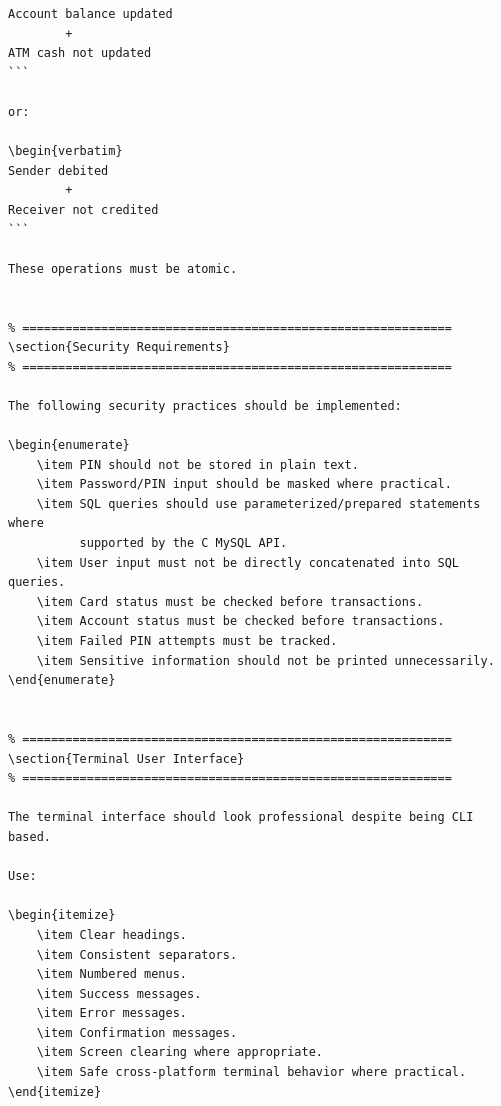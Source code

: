 \documentclass[12pt,a4paper]{article}
\begin{document}
\begin{verbatim}
Account balance updated
        +
ATM cash not updated
```

or:

\begin{verbatim}
Sender debited
        +
Receiver not credited
```

These operations must be atomic.


% ============================================================
\section{Security Requirements}
% ============================================================

The following security practices should be implemented:

\begin{enumerate}
    \item PIN should not be stored in plain text.
    \item Password/PIN input should be masked where practical.
    \item SQL queries should use parameterized/prepared statements where
          supported by the C MySQL API.
    \item User input must not be directly concatenated into SQL queries.
    \item Card status must be checked before transactions.
    \item Account status must be checked before transactions.
    \item Failed PIN attempts must be tracked.
    \item Sensitive information should not be printed unnecessarily.
\end{enumerate}


% ============================================================
\section{Terminal User Interface}
% ============================================================

The terminal interface should look professional despite being CLI based.

Use:

\begin{itemize}
    \item Clear headings.
    \item Consistent separators.
    \item Numbered menus.
    \item Success messages.
    \item Error messages.
    \item Confirmation messages.
    \item Screen clearing where appropriate.
    \item Safe cross-platform terminal behavior where practical.
\end{itemize}


\end{verbatim}
\end{document}

